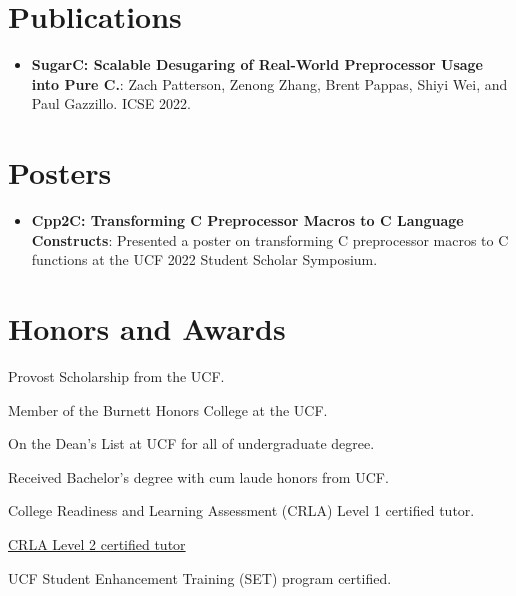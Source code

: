 \documentclass[a4paper,20pt]{article}
\newcommand{\resumeItem}[2]{
  \item\small{
    \textbf{#1}{: #2 \vspace{-2pt}}
  }
}
\newcommand{\resumeSubItem}[2]{\resumeItem{#1}{#2}\vspace{-3pt}}
\newcommand{\resumeSubHeadingListStart}{\begin{itemize}[leftmargin=*]}
\newcommand{\resumeSubHeadingListEnd}{\end{itemize}}
\begin{document}
\vspace{-5pt}
\section{Publications}
\resumeSubHeadingListStart
\resumeSubItem
{SugarC: Scalable Desugaring of Real-World Preprocessor Usage into Pure C.}
{Zach Patterson, Zenong Zhang, Brent Pappas, Shiyi Wei, and Paul Gazzillo. ICSE 2022.}
\resumeSubHeadingListEnd

\vspace{-5pt}
\section{Posters}
\resumeSubHeadingListStart
\resumeSubItem
{Cpp2C: Transforming C Preprocessor Macros to C Language Constructs}
{Presented a poster on transforming C preprocessor macros to C functions at the UCF 2022 Student Scholar Symposium.}
\resumeSubHeadingListEnd

\vspace{-5pt}
\section{Honors and Awards}
\begin{description}[font=$\bullet$]
    \item {Provost Scholarship from the UCF.}
          \vspace{-5pt}
    \item {Member of the Burnett Honors College at the UCF.}
          \vspace{-5pt}
    \item {On the Dean's List at UCF for all of undergraduate degree.}
          \vspace{-5pt}
    \item {Received Bachelor's degree with cum laude honors from UCF.}
          \vspace{-5pt}
    \item {College Readiness and Learning Assessment (CRLA) Level 1 certified tutor.}
          \vspace{-5pt}
    \item {\href{https://drive.google.com/file/d/1idZ5hhQQF4f-ZRQCBUplQTGU9YjS7fUs/view?usp=sharing}{CRLA Level 2 certified tutor}}
          \vspace{-5pt}
    \item {UCF Student Enhancement Training (SET) program certified.}

\end{description}
\end{document}
